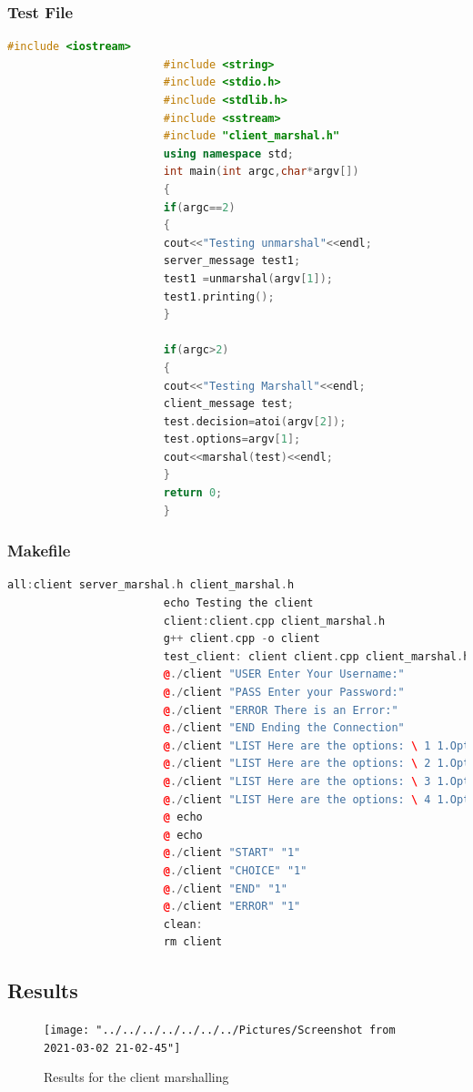 \documentclass[11pt]{article}
\begin{document}
				\subsubsection{Test File}
					\begin{lstlisting}[language=C++]
						#include <iostream>
						#include <string>
						#include <stdio.h>
						#include <stdlib.h>
						#include <sstream>
						#include "client_marshal.h"
						using namespace std;
						int main(int argc,char*argv[])
						{
						if(argc==2)
						{
						cout<<"Testing unmarshal"<<endl;
						server_message test1;
						test1 =unmarshal(argv[1]);
						test1.printing();
						}
						
						if(argc>2)
						{
						cout<<"Testing Marshall"<<endl;
						client_message test;
						test.decision=atoi(argv[2]);
						test.options=argv[1];
						cout<<marshal(test)<<endl;
						}
						return 0;
						}
					\end{lstlisting}
				\subsubsection{Makefile}
					\begin{lstlisting}[language=C++]
						all:client server_marshal.h client_marshal.h
						echo Testing the client
						client:client.cpp client_marshal.h
						g++ client.cpp -o client				
						test_client: client client.cpp client_marshal.h
						@./client "USER Enter Your Username:"
						@./client "PASS Enter your Password:"
						@./client "ERROR There is an Error:"
						@./client "END Ending the Connection"
						@./client "LIST Here are the options: \ 1 1.Option 1 \\"
						@./client "LIST Here are the options: \ 2 1.Option 1 \ 2. Option 2 \\"
						@./client "LIST Here are the options: \ 3 1.Option 1 \ 2. Option 2 \ 3. Option 3 \\"
						@./client "LIST Here are the options: \ 4 1.Option 1 \ 2. Option 2 \ 3. Option 3 \ 4. Option 4 \\"
						@ echo
						@ echo
						@./client "START" "1"
						@./client "CHOICE" "1"
						@./client "END" "1"
						@./client "ERROR" "1"
						clean:
						rm client
					\end{lstlisting}
				\subsection{Results}	
					\begin{figure}[H]
						\centering
						\texttt{[image: "../../../../../../../Pictures/Screenshot from 2021-03-02 21-02-45"]}
						\caption{Results for the client marshalling}
						\label{fig:screenshot-from-2021-03-02-21-02-45}
					\end{figure}
\end{document}
